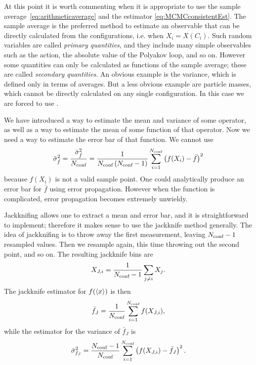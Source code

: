 At this point it is worth commenting when it is appropriate to use
the sample average~\eqref{eq:arithmeticaverage} and the estimator
\eqref{eq:MCMCconsistentEst}. The sample average is the preferred 
method to estimate an observable that can be directly calculated from 
the configurations, i.e. when $X_i=X(C_i)$. 
Such random variables are called {\it primary quantities},
 and they include many simple observables such
as the action, the absolute value of the Polyakov loop, and so on. 
However some quantities can only be calculated 
as functions of the sample average; these are called {\it secondary quantities}.
 An obvious example is the variance, which is defined
only in terms of averages. But a less obvious example are particle masses,
which cannot be directly calculated on any single configuration. In this
case we are forced to use .

We have introduced a way to estimate the mean and variance of some
operator, as well as a way to estimate the mean of some function of
that operator. Now we need a way to estimate the error bar of that
function. We cannot use
\begin{equation}
  \bar{\sigma}^2_{\bar{f}}=\frac{\bar{\sigma}^2_{\bar{f}}}{N_{\text{conf}}}
    =\frac{1}{N_{\text{conf}}\,(N_{\text{conf}}-1)}\sum_{i=1}^{N_{\text{conf}}}
     \left(f(X_i)-\bar{f}\right)^2
\end{equation}
because $f(X_i)$ is not a valid sample point.
One could analytically produce an error bar for $\bar{f}$ 
using error propagation. However when the function is complicated, 
error propagation becomes extremely unwieldy.

Jackknifing allows one to extract a mean and error bar,
and it is straightforward to implement; 
therefore it makes sense to use the jackknife method generally.
The idea of jackknifing is to throw away the first measurement, 
leaving $N_{\text{conf}}-1$ resampled values. Then we resample again, this
time throwing out the second point, and so on. The resulting
jackknife bins are
\begin{equation}
  X_{J,i}=\frac{1}{N_{\text{conf}}-1}\sum_{j\neq i}X_j.
\end{equation}
The jackknife estimator for $f(\ev{x})$ is then
\begin{equation}
  \bar{f}_J=\frac{1}{N_{\text{conf}}}\sum_{i=1}^{N_{\text{conf}}}f(X_{J,i}),
\end{equation}
while the estimator for the variance of $\bar{f}_J$ is
\begin{equation}
  \bar{\sigma}^2_{f_J}=\frac{N_{\text{conf}}-1}{N_{\text{conf}}}\sum_{i=1}^{N_{\text{conf}}}
    \left(f(X_{J,i})-\bar{f}_J\right)^2.
\end{equation}

